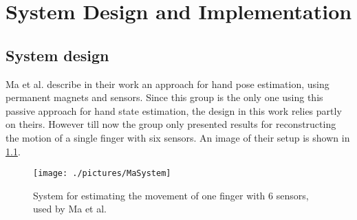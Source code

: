 \lhead[\chaptername~\thechapter]{\rightmark}

\rhead[\leftmark]{}

\lfoot[\thepage]{}

\cfoot{}

\rfoot[]{\thepage}

\chapter{System Design and Implementation} \label{cha:sysDesign}

\section{System design} \label{cha:design}

Ma et al. \cite{ma2010magnetic} describe in their work an approach for hand pose estimation, using permanent magnets and sensors. Since this group is the only one using this passive approach for hand state estimation, the design in this work relies partly on theirs. However till now the group only presented results for reconstructing the motion of a single finger with six sensors. An image of their setup is shown in \ref{fig:MaSystem}.

\begin{figure}[h]
\centering
\texttt{[image: ./pictures/MaSystem]}
\caption{System for estimating the movement of one finger with 6 sensors, used by Ma et al. \cite{ma2010magnetic}}
\label{fig:MaSystem}
\end{figure}


